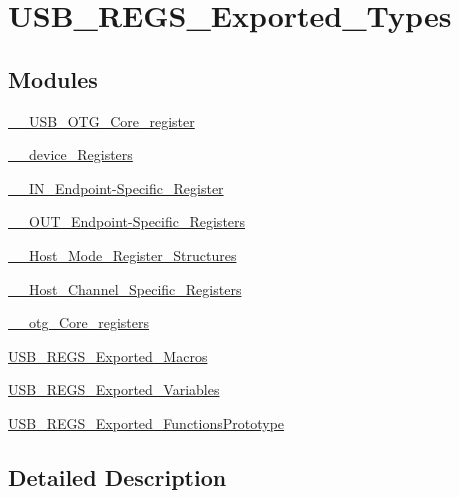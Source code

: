 \hypertarget{group___u_s_b___r_e_g_s___exported___types}{\section{U\-S\-B\-\_\-\-R\-E\-G\-S\-\_\-\-Exported\-\_\-\-Types}
\label{group___u_s_b___r_e_g_s___exported___types}
}
\subsection*{Modules}
\begin{DoxyCompactItemize}
\item 
\hyperlink{group_______u_s_b___o_t_g___core__register}{\-\_\-\-\_\-\-U\-S\-B\-\_\-\-O\-T\-G\-\_\-\-Core\-\_\-register}
\item 
\hyperlink{group______device___registers}{\-\_\-\-\_\-device\-\_\-\-Registers}
\item 
\hyperlink{group_______i_n___endpoint-_specific___register}{\-\_\-\-\_\-\-I\-N\-\_\-\-Endpoint-\/\-Specific\-\_\-\-Register}
\item 
\hyperlink{group_______o_u_t___endpoint-_specific___registers}{\-\_\-\-\_\-\-O\-U\-T\-\_\-\-Endpoint-\/\-Specific\-\_\-\-Registers}
\item 
\hyperlink{group_______host___mode___register___structures}{\-\_\-\-\_\-\-Host\-\_\-\-Mode\-\_\-\-Register\-\_\-\-Structures}
\item 
\hyperlink{group_______host___channel___specific___registers}{\-\_\-\-\_\-\-Host\-\_\-\-Channel\-\_\-\-Specific\-\_\-\-Registers}
\item 
\hyperlink{group______otg___core__registers}{\-\_\-\-\_\-otg\-\_\-\-Core\-\_\-registers}
\item 
\hyperlink{group___u_s_b___r_e_g_s___exported___macros}{U\-S\-B\-\_\-\-R\-E\-G\-S\-\_\-\-Exported\-\_\-\-Macros}
\item 
\hyperlink{group___u_s_b___r_e_g_s___exported___variables}{U\-S\-B\-\_\-\-R\-E\-G\-S\-\_\-\-Exported\-\_\-\-Variables}
\item 
\hyperlink{group___u_s_b___r_e_g_s___exported___functions_prototype}{U\-S\-B\-\_\-\-R\-E\-G\-S\-\_\-\-Exported\-\_\-\-Functions\-Prototype}
\end{DoxyCompactItemize}


\subsection{Detailed Description}
